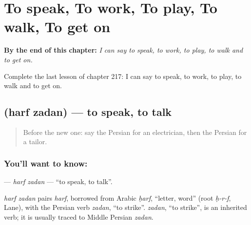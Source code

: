 
\chapter{To speak, To work, To play, To walk, To get on}
\label{ch:fa-to-speak-to-work-to-play-to-walk-to-get-on}

\begin{chapteropening}
\textbf{By the end of this chapter:} \emph{I can say to speak, to work, to play, to walk and to get on.}

Complete the last lesson of chapter 217: I can say to speak, to work, to play, to walk and to get on.
\end{chapteropening}

\section[\texorpdfstring{\fa{حرف} \fa{زدن} (harf zadan)}{حرف زدن (harf zadan)}]{  (harf zadan) — to speak, to talk}

\label{lesson:FA-C217-harf-zadan}



\begin{quote}
Before the new one: say the Persian for an electrician, then the Persian for a tailor.
\end{quote}

\subsection*{You'll want to know:  }
\textbf{ } — \emph{harf zadan} — \textquotedblleft{}to speak, to talk\textquotedblright{}.

\begin{cousinweb}
\emph{harf zadan} pairs \emph{harf}, borrowed from Arabic \emph{ḥarf}, \textquotedblleft{}letter, word\textquotedblright{} (root \emph{ḥ-r-f}, Lane), with the Persian verb \emph{zadan}, \textquotedblleft{}to strike\textquotedblright{}. \emph{zadan}, \textquotedblleft{}to strike\textquotedblright{}, is an inherited verb; it is usually traced to Middle Persian \emph{zadan}.
\end{cousinweb}

